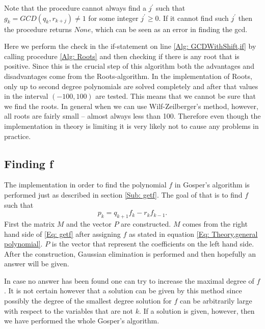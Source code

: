 \begin{remark}
  Note that the procedure cannot always find a $j^\prime$ such that $g_k=GCD(q_k,r_{k+j})\neq 1$ for some integer $j^\prime\geq 0$. If it cannot find such $j^\prime$ then the procedure returns $None$, which can be seen as an error in finding the gcd.
\end{remark}
Here we perform the check in the if-statement on line \ref{Alg: GCDWithShift,if} by calling procedure \ref{Alg: Roots} and then checking if there is any root that is positive. Since this is the crucial step of this algorithm both the advantages and disadvantages come from the Roots-algorithm. In the implementation of Roots, only up to second degree polynomials are solved completely and after that values in the interval $(-100,100)$ are tested. This means that we cannot be sure that we find the roots. In general when we can use Wilf-Zeilberger's method, however, all roots are fairly small -- almost always less than 100. Therefore even though the implementation in theory is limiting it is very likely not to cause any problems in practice.
\subsection{Finding f}
The implementation in order to find the polynomial $f$ in Gosper's algorithm is performed just as described in section \ref{Sub: getf}. The goal of that is to find $f$ such that
\begin{equation}\label{Eq: getf}
  p_k=q_{k+1}f_k-r_kf_{k-1}.
\end{equation}
First the matrix $M$ and the vector $P$ are constructed. $M$ comes from the right hand side of \eqref{Eq: getf} after assigning $f$ as stated in equation \eqref{Eq: Theory,general polynomial}. $P$ is the vector that represent the coefficients on the left hand side. After the construction, Gaussian elimination is performed and then hopefully an answer will be given.

In case no answer has been found one can try to increase the maximal degree of $f$. It is not certain however that a solution can be given by this method since possibly the degree of the smallest degree solution for $f$ can be arbitrarily large with respect to the variables that are not $k$. If a solution is given, however, then we have performed the whole Gosper's algorithm.

